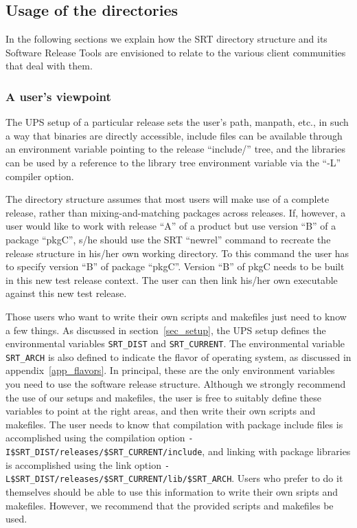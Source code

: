 \subsection{Usage of the directories}

    In the following sections we explain how the SRT directory structure and 
its Software Release Tools are envisioned to relate to the various client 
communities that deal with them. 

\subsubsection{A user's viewpoint}

    The UPS setup of a particular release sets the user's path, manpath, etc., 
in such a way that binaries are directly accessible, include files can be 
available through an environment variable pointing to the release ``include/'' 
tree, and the libraries can be used by a reference to the library tree 
environment variable via the ``-L'' compiler option. 

    The directory structure assumes that most users will make use of a complete
release, rather than mixing-and-matching packages across releases. If, however, 
a user would like to work with release ``A'' of a product but use version ``B'' of 
a package ``pkgC'', s/he should use the SRT ``newrel'' command to recreate the 
release structure in his/her own working directory. To this command the user 
has to specify version ``B'' of package ``pkgC''. Version ``B'' of pkgC needs to 
be built in this new test release context. The user can then link his/her own 
executable against this new test release. 

\begin{sloppypar}
Those users who want to write their own scripts and makefiles just need to 
know a few things. As discussed in section~\ref{sec_setup}, the UPS setup 
defines the environmental variables \texttt{SRT\_DIST} and \texttt{SRT\_CURRENT}.  
The environmental variable \texttt{SRT\_ARCH} is also defined to indicate the flavor 
of operating system, as discussed in appendix~\ref{app_flavors}. In principal,
these are the only environment variables you need to use the software release 
structure. Although we strongly recommend the use of our setups and makefiles, 
the user is free to suitably define these variables to point at the right areas,
and then write their own scripts and makefiles.  The user needs to know 
that compilation with package include files  is 
accomplished using the compilation option 
\texttt{-I\$SRT\_DIST/releases/\$SRT\_CURRENT/include}, and linking with package
libraries is accomplished using the link option 
\texttt{-L\$SRT\_DIST/releases/\$SRT\_CURRENT/lib/\$SRT\_ARCH}. Users who 
prefer to do it themselves should be able to use this information to write 
their own sripts and makefiles.  However, we recommend that the provided
scripts and makefiles be used.
\end{sloppypar}

